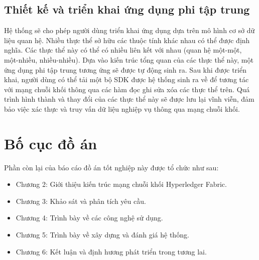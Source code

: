 \documentclass[../DoAn.tex]{subfiles}
\begin{document}
\subsection{Thiết kế và triển khai ứng dụng phi tập trung}
Hệ thống sẽ cho phép người dùng triển khai ứng dụng dựa trên mô hình cơ sở dữ liệu quan hệ. Nhiều thực thể sở hữu các thuộc tính khác nhau có thể được định nghĩa. Các thực thể này có thể có nhiều liên kết với nhau (quan hệ một-một, một-nhiều, nhiều-nhiều). Dựa vào kiến trúc tổng quan của các thực thể này, một ứng dụng phi tập trung tương ứng sẽ được tự động sinh ra. Sau khi được triển khai, người dùng có thể tải một bộ SDK được hệ thống sinh ra về để tương tác với mạng chuỗi khối thông qua các hàm đọc ghi sửa xóa các thực thể trên. Quá trình hình thành và thay đổi của các thực thể này sẽ được lưu lại vĩnh viễn, đảm bảo việc xác thực và truy vấn dữ liệu nghiệp vụ thông qua mạng chuỗi khối.

\section{Bố cục đồ án}
\label{section:1.4}
Phần còn lại của báo cáo đồ án tốt nghiệp này được tổ chức như sau:

\begin{itemize}
	\item Chương 2: Giới thiệu kiến trúc mạng chuỗi khối Hyperledger Fabric.
	\item Chương 3: Khảo sát và phân tích yêu cầu.
	\item Chương 4: Trình bày về các công nghệ sử dụng.
	\item Chương 5: Trình bày về xây dựng và đánh giá hệ thống.
	\item Chương 6: Kết luận và định hương phát triển trong tương lai.
\end{itemize}




\end{document}
